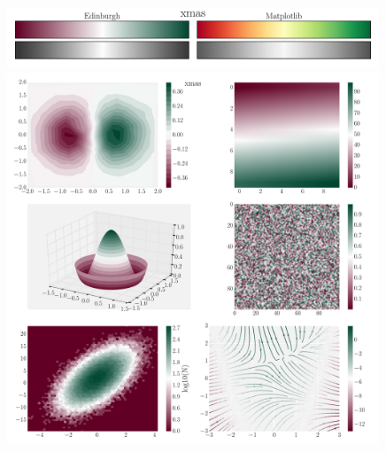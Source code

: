\documentclass[10pt,a4paper]{article}
\begin{document}
\newpage
\begin{figure}[ht]
  \centering
  \includegraphics[width=0.99\textwidth]{xmasBars.pdf}
  \includegraphics[width=0.99\textwidth]{xmasExamples.pdf}
\end{figure}
\end{document}
